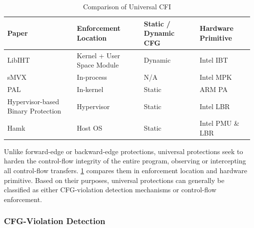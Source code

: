 \documentclass[journal,onecolumn]{IEEEtran}
\begin{document}
\begin{table}[t]
	\centering
	\caption{Comparison of Universal CFI}
	\label{tab:universal}
	\renewcommand{\arraystretch}{1.35}
	\setlength{\tabcolsep}{3.5pt}
	
	\begin{tabularx}{\columnwidth}{
			>{\raggedright\arraybackslash}p{}
			>{\centering\arraybackslash}p{}
			>{\centering\arraybackslash}p{}
			>{\raggedright\arraybackslash}X
		}
		\toprule
		\textbf{Paper} &
		\textbf{Enforcement Location} &
		\textbf{Static / Dynamic CFG} &
		\textbf{Hardware Primitive}\\
		\midrule
		
		LibIHT \cite{Zhao25} &
		Kernel + User Space Module&
		Dynamic&
		Intel IBT\\[2pt]
		
		sMVX \cite{Yeoh24} &
		In-process&
		N/A&
		Intel MPK\\[2pt]
		
		PAL \cite{Yoo22} &
		In-kernel&
		Static&
		ARM PA\\[2pt] 
		
		Hypervisor-based Binary Protection \cite{Zaidenberg26} &
		Hypervisor&
		Static&
		Intel LBR\\[2pt]
		
		Hamk \cite{Sun26} &
		Host OS&
		Static&
		Intel PMU \& LBR\\
		
		\bottomrule
	\end{tabularx}
\end{table}

Unlike forward-edge or backward-edge protections, universal protections seek to harden the control-flow integrity of the entire program, observing or intercepting all control-flow transfers. \ref{tab:universal} compares them in enforcement location and hardware primitive. Based on their purposes, universal protections can generally be classified as either CFG-violation detection mechanisms or control-flow enforcement.

\subsubsection{CFG-Violation Detection}
\end{document}
